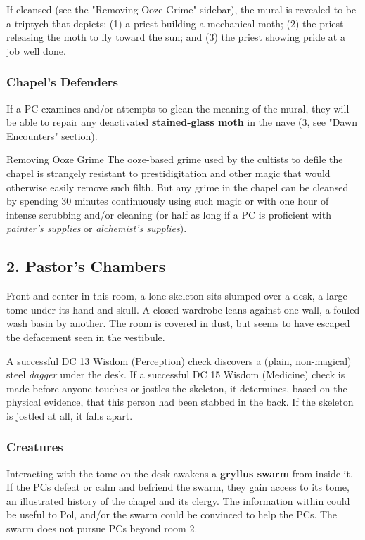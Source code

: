 \documentclass[10pt,a4paper,twoside,bg=print,twocolumn,openany,nodeprecatedcode]{dndbook}
\begin{document}
If cleansed (see the "Removing Ooze Grime" sidebar), the mural is revealed to be a triptych that depicts: (1) a priest building a mechanical moth; (2) the priest releasing the moth to fly toward the sun; and (3) the priest showing pride at a job well done.

\subsubsection{Chapel's Defenders}
If a PC examines and/or attempts to glean the meaning of the mural, they will be able to repair any deactivated \textbf{stained-glass moth} in the nave (3, see "Dawn Encounters" section).

\begin{DndSidebar}[float=!b]{Removing Ooze Grime}
The ooze-based grime used by the cultists to defile the chapel is strangely resistant to prestidigitation and other magic that would otherwise easily remove such filth. But any grime in the chapel can be cleansed by spending 30 minutes continuously using such magic or with one hour of intense scrubbing and/or cleaning (or half as long if a PC is proficient with \textit{painter's supplies} or \textit{alchemist's supplies}).



\end{DndSidebar}

\subsection{2. Pastor's Chambers}
\begin{DndReadAloud}{}
Front and center in this room, a lone skeleton sits slumped over a desk, a large tome under its hand and skull. A closed wardrobe leans against one wall, a fouled wash basin by another. The room is covered in dust, but seems to have escaped the defacement seen in the vestibule.

\end{DndReadAloud}

A successful DC 13 Wisdom (Perception) check discovers a (plain, non-magical) steel \textit{dagger} under the desk. If a successful DC 15 Wisdom (Medicine) check is made before anyone touches or jostles the skeleton, it determines, based on the physical evidence, that this person had been stabbed in the back. If the skeleton is jostled at all, it falls apart.

\subsubsection{Creatures}
Interacting with the tome on the desk awakens a \textbf{gryllus swarm} from inside it. If the PCs defeat or calm and befriend the swarm, they gain access to its tome, an illustrated history of the chapel and its clergy. The information within could be useful to Pol, and/or the swarm could be convinced to help the PCs. The swarm does not pursue PCs beyond room 2.
\end{document}
